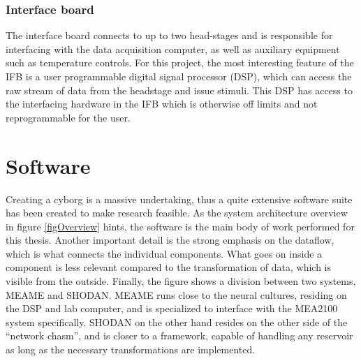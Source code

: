 \subsubsection{Interface board}
The interface board connects to up to two head-stages and is responsible for
interfacing with the data acquisition computer, as well as auxiliary equipment
such as temperature controls.
For this project, the most interesting feature of the IFB is a user programmable
digital signal processor (DSP), which can access the raw stream of data from the
headstage and issue stimuli.
This DSP has access to the interfacing hardware in the IFB which is otherwise
off limits and not reprogrammable for the user.
\section{Software}
Creating a cyborg is a massive undertaking, thus a quite extensive software
suite has been created to make research feasible.
As the system architecture overview in figure \ref{figOverview} hints, the software is the
main body of work performed for this thesis.
Another important detail is the strong emphasis on the dataflow, which is what
connects the individual components.
What goes on inside a component is less relevant compared to the transformation
of data, which is visible from the outside.
Finally, the figure shows a division between two systems, MEAME and SHODAN.
MEAME runs close to the neural cultures, residing on the DSP and lab computer,
and is specialized to interface with the MEA2100 system specifically.
SHODAN on the other hand resides on the other side of the ``network chasm'', and
is closer to a framework, capable of handling any reservoir as long as the
necessary transformations are implemented.
